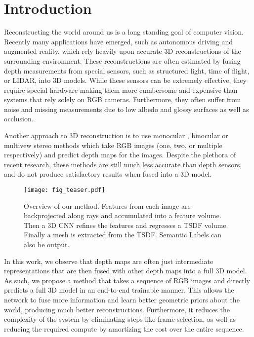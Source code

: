 \documentclass[runningheads]{llncs}
\begin{document}
\section{Introduction}
Reconstructing the world around us is a long standing goal of computer vision.
Recently many applications have emerged,
such as autonomous driving and augmented reality,
which rely heavily upon accurate 3D reconstructions of the surrounding environment.
These reconstructions are often estimated by fusing depth measurements from special sensors, such as structured light, time of flight, or LIDAR, into 3D models.
While these sensors can be extremely effective,
they require special hardware making them more cumbersome and expensive than systems that rely solely on RGB cameras.
Furthermore, they often suffer from noise and missing measurements due to low albedo and glossy surfaces as well as occlusion.


Another approach to 3D reconstruction is to use monocular \cite{lasinger2019towards, lee2019big, fu2018deep}, binocular \cite{chang2018pyramid, chabra2019stereodrnet} or multivew \cite{im2019dpsnet, huang2018deepmvs, wang2018mvdepthnet, hirschmuller2007stereo} stereo methods which take RGB images (one, two, or multiple respectively) and predict depth maps for the images.
Despite the plethora of recent research, these methods are still much less accurate than depth sensors, and
do not produce satisfactory results when fused into a 3D model.

\begin{figure}
\centering
\texttt{[image: fig\_teaser.pdf]}
\caption{
Overview of our method. Features from each image are backprojected along rays and accumulated into a feature volume.
Then a 3D CNN refines the features and regresses a TSDF volume. Finally a mesh is extracted from the TSDF.
Semantic Labels can also be output.
}

\label{fig:teaser}
\end{figure}

In this work, we observe that depth maps are often just intermediate representations that
are then fused with other depth maps into a full 3D model.
As such, we propose a method that takes a sequence of RGB images
and directly predicts a full 3D model in an end-to-end trainable manner.
This allows the network to fuse more information and learn better geometric priors about the world,
producing much better reconstructions.
Furthermore, it reduces the complexity of the system by eliminating steps like frame selection,
as well as reducing the required compute by amortizing the cost over the entire sequence.
\end{document}
